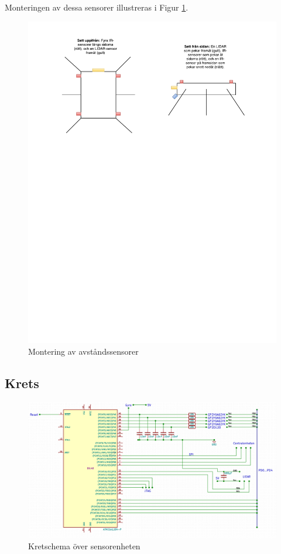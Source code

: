 \documentclass[a4paper,titlepage,12pt]{article}
\begin{document}
	    Monteringen av dessa sensorer illustreras i Figur \ref{fig:sensor_mount}.


    \begin{figure}[h]
        \includegraphics[width=17cm, trim=2cm 18cm 0cm 0cm]{images/sensor_mount.pdf}
        \caption{Montering av avståndssensorer\label{fig:sensor_mount}}
    \end{figure}

    \newpage
    \subsection{Krets}

    \begin{figure}[h]
        \includegraphics[width=15cm]{images/schematic_sensor.png}
        \caption{Kretschema över sensorenheten\label{fig:schem_sensor}}
    \end{figure}
\end{document}
